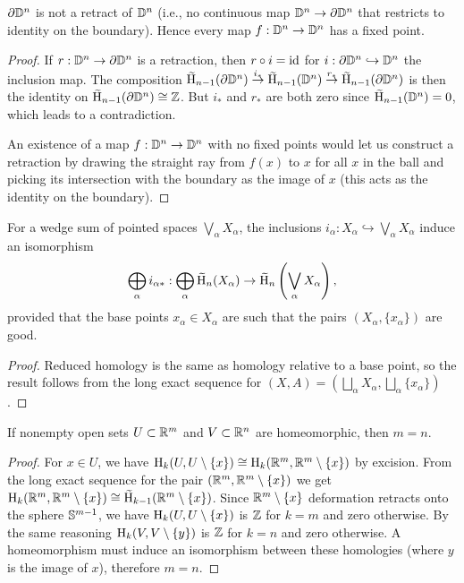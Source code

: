 \begin{cor}
    $\partial \mathbb{D}^n$ is not a retract of $\mathbb{D}^n$ (i.e., no continuous map $\mathbb{D}^n\to \partial \mathbb{D}^n$ that restricts to identity on the boundary). Hence every map $f:\mathbb{D}^n\to \mathbb{D}^n$ has a fixed point.
\end{cor}
\begin{proof}
     If $r:\mathbb{D}^n\to \partial \mathbb{D}^n$ is a retraction, then $r\circ i=\operatorname{id}$ for $i:\partial \mathbb{D}^n\hookrightarrow \mathbb{D}^n$ the inclusion map. The composition $\wt{\rmH}_{n-1}(\partial \bbD^n)\overset{i_\ast}\to \wt{\rmH}_{n-1}(\bbD^n)\overset{r_\ast}\to \wt{\rmH}_{n-1}(\partial \bbD^n)$ is then the identity on $\wt{\rmH}_{n-1}(\partial \bbD^n)\cong \bbZ$. But $i_\ast$ and $r_\ast$ are both zero since $\wt{\rmH}_{n-1}(\bbD^n)=0$, which leads to a contradiction.
     
     An existence of a map $f:\mathbb{D}^n\to \mathbb{D}^n$ with no fixed points would let us construct a retraction by drawing the straight ray from $f(x)$ to $x$ for all $x$ in the ball and picking its intersection with the boundary as the image of $x$ (this acts as the identity on the boundary).
\end{proof}



\begin{cor}
    For a wedge sum of pointed spaces $\bigvee_{\alpha}X_\alpha$, the inclusions $i_\alpha:X_\alpha\hookrightarrow \bigvee_{\alpha}X_\alpha$ induce an isomorphism 
    \[\bigoplus_\alpha i_{\alpha\ast}:\bigoplus_\alpha\wt{\rmH}_n(X_\alpha)\to \wt{\rmH}_n\left(\bigvee_{\alpha}X_\alpha\right),\]
    provided that the base points $x_\alpha\in X_\alpha$ are such that the pairs $(X_\alpha,\{x_\alpha\})$ are good.
\end{cor}
\begin{proof}
     Reduced homology is the same as homology relative to a base point, so the result follows from the long exact sequence for $(X,A)=\left(\bigsqcup_\alpha X_\alpha, \bigsqcup_\alpha \{x_\alpha\}\right)$.
\end{proof}

\begin{cor}
    If nonempty open sets $U\subset \mathbb{R}^m$ and $V\subset \mathbb{R}^n$ are homeomorphic, then $m=n$.
\end{cor}
\begin{proof}
     For $x\in U$, we have $\mathrm{H}_k(U,U\setminus \{x\})\cong \mathrm{H}_k(\mathbb{R}^m,\mathbb{R}^m\setminus \{x\})$ by excision. From the long exact sequence for the pair $(\mathbb{R}^m,\mathbb{R}^m\setminus\{x\})$ we get $\rmH_k(\bbR^m,\bbR^m\setminus\{x\})\cong \wt{\rmH}_{k-1}(\bbR^m\setminus\{x\})$. Since $\mathbb{R}^m\setminus\{x\}$ deformation retracts onto the sphere $\mathbb{S}^{m-1}$, we have $\mathrm{H}_k(U,U\setminus\{x\})$ is $\mathbb{Z}$ for $k=m$ and zero otherwise. By the same reasoning $\mathrm{H}_k(V,V\setminus\{y\})$ is $\mathbb{Z}$ for $k=n$ and zero otherwise. A homeomorphism must induce an isomorphism between these homologies (where $y$ is the image of $x$), therefore $m=n$.
\end{proof}





